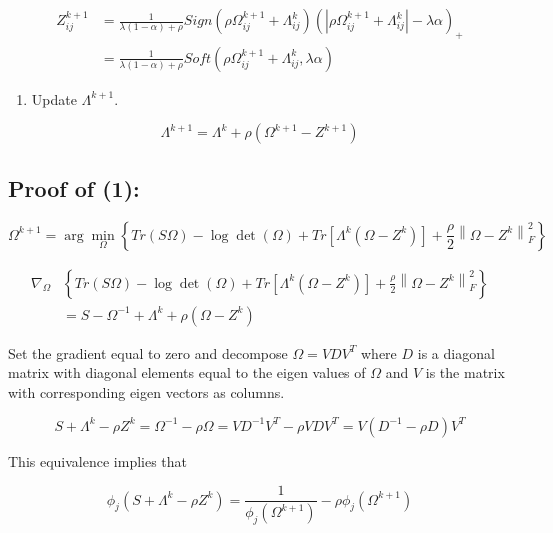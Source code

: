 \documentclass[11pt,]{book}
\providecommand{\tightlist}{%
  \setlength{\itemsep}{0pt}\setlength{\parskip}{0pt}}
\theoremstyle{definition}
\theoremstyle{definition}
\theoremstyle{definition}
\theoremstyle{remark}
\begin{document}
\begin{align*}
Z_{ij}^{k + 1} &= \frac{1}{\lambda(1 - \alpha) + \rho}Sign\left(\rho\Omega_{ij}^{k + 1} + \Lambda_{ij}^{k}\right)\left( \left| \rho\Omega_{ij}^{k + 1} + \Lambda_{ij}^{k} \right| - \lambda\alpha \right)_{+} \\
&= \frac{1}{\lambda(1 - \alpha) + \rho}Soft\left(\rho\Omega_{ij}^{k + 1} + \Lambda_{ij}^{k}, \lambda\alpha\right)
\end{align*}

\begin{enumerate}
\def\labelenumi{\arabic{enumi}.}
\setcounter{enumi}{2}
\tightlist
\item
  Update \(\Lambda^{k + 1}\).
\end{enumerate}

\[ \Lambda^{k + 1} = \Lambda^{k} + \rho\left( \Omega^{k + 1} - Z^{k + 1} \right) \]

\vspace{1cm}

\hypertarget{proof-of-1}{%
\subsection{Proof of (1):}\label{proof-of-1}}

\[ \Omega^{k + 1} = \arg\min_{\Omega}\left\{ Tr\left(S\Omega\right) - \log\det\left(\Omega\right) + Tr\left[\Lambda^{k}\left(\Omega - Z^{k}\right)\right] + \frac{\rho}{2}\left\| \Omega - Z^{k} \right\|_{F}^{2} \right\} \]

\begin{align*}
  \nabla_{\Omega}&\left\{ Tr\left(S\Omega\right) - \log\det\left(\Omega\right) + Tr\left[\Lambda^{k}\left(\Omega - Z^{k}\right)\right] + \frac{\rho}{2}\left\| \Omega - Z^{k} \right\|_{F}^{2} \right\} \\
  &= S - \Omega^{-1} + \Lambda^{k} + \rho\left( \Omega - Z^{k} \right)
\end{align*}

Set the gradient equal to zero and decompose \(\Omega = VDV^{T}\) where
\(D\) is a diagonal matrix with diagonal elements equal to the eigen
values of \(\Omega\) and \(V\) is the matrix with corresponding eigen
vectors as columns.

\[ S + \Lambda^{k} - \rho Z^{k} = \Omega^{-1} - \rho \Omega = VD^{-1}V^{T} - \rho VDV^{T} =  V\left(D^{-1} - \rho D\right)V^{T} \]

This equivalence implies that

\[ \phi_{j}\left( S + \Lambda^{k} - \rho Z^{k} \right) = \frac{1}{\phi_{j}(\Omega^{k + 1})} - \rho\phi_{j}(\Omega^{k + 1}) \]
\end{document}
